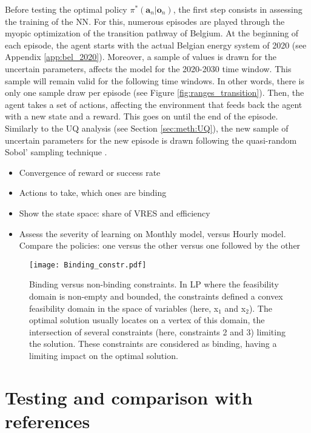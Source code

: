 Before testing the optimal policy $\pi^*\left(\bm{a}_n | \bm{o}_n\right)$, the first step consists in assessing the training of the \gls{NN}. For this, numerous episodes are played through the myopic optimization of the transition pathway of Belgium. At the beginning of each episode, the agent starts with the actual Belgian energy system of 2020 (see Appendix \ref{app:bel_2020}). Moreover, a sample of values is drawn for the uncertain parameters, affects the model for the 2020-2030 time window. This sample will remain valid for the following time windows. In other words, there is only one sample draw per episode (see Figure \ref{fig:ranges_transition}).  Then, the agent takes a set of actions, affecting the environment that feeds back the agent with a new state and a reward. This goes on until the end of the episode. Similarly to the \gls{UQ} analysis (see Section \ref{sec:meth:UQ}), the new sample of uncertain parameters for the new episode is drawn following the quasi-random Sobol' sampling technique \cite{bratley2003implementing}.

\begin{itemize}
\item Convergence of reward or success rate
\item Actions to take, which ones are binding
\item Show the state space: share of \gls{VRES} and efficiency
\item Assess the severity of learning on Monthly model, versus Hourly model. Compare the policies: one versus the other versus one followed by the other
\end{itemize}

\begin{figure}[!htbp]
\centering
\texttt{[image: Binding\_constr.pdf]}
\caption{Binding versus non-binding constraints. In \gls{LP} where the feasibility domain is non-empty and bounded, the constraints defined a convex feasibility domain in the space of variables (here, x$_1$ and x$_2$). The optimal solution usually locates on a vertex of this domain, \ie the intersection of several constraints (here, constraints 2 and 3) limiting the solution. These constraints are considered as binding, \ie having a limiting impact on the optimal solution.}
\label{fig:Reward}
\end{figure} 


\section{Testing and comparison with references}
\label{sec:RL:testing}



